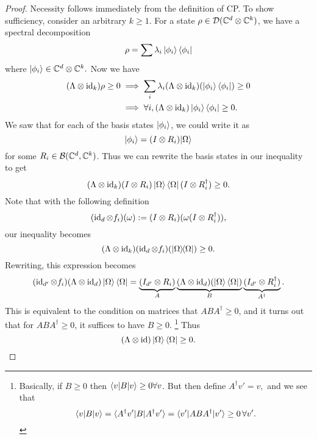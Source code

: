 \begin{proof}
    Necessity follows immediately from the definition of CP. To show sufficiency, consider an arbitrary $k\geq 1$. For a state $\rho \in \mathcal{D}(\mathbb{C}^d \otimes \mathbb{C}^k)$, we have a spectral decomposition
    \begin{equation}
        \rho =\sum \lambda_i \left| \phi_i \right>\left< \phi_i \right|
    \end{equation}
    where $\lvert\phi_i\rangle\in \mathbb{C}^d \otimes \mathbb{C}^k.$
    Now we have
    \begin{align}
        (\Lambda \otimes \text{id}_k)\rho \geq 0 &\implies \sum_i \lambda_i(\Lambda \otimes \operatorname{id}_k)(\left| \phi_i \right>\left< \phi_i \right|)\geq 0\\
        &\implies \forall i, (\Lambda \otimes \operatorname{id}_k)\left| \phi_i \right>\left< \phi_i \right| \geq 0.
    \end{align}
    We saw that for each of the basis states $\lvert\phi_i\rangle$, we could write it as
    \begin{equation}
        \lvert\phi_i\rangle=(I\otimes R_i)\lvert\Omega\rangle
    \end{equation}
    for some $R_i\in \mathcal{B}(\mathbb{C}^d, \mathbb{C}^k)$. Thus we can rewrite the basis states in our inequality to get
    \begin{equation}
        (\Lambda \otimes \operatorname{id}_k)(I\otimes R_i)\left| \Omega \right>\left< \Omega \right| (I\otimes R_i^\dagger)\geq 0.
    \end{equation}
    Note that with the following definition
    \begin{equation}
        (\operatorname{id}_d \otimes f_i)(\omega) := (I\otimes R_i)(\omega(I\otimes R_i^\dagger)),
    \end{equation}
    our inequality becomes
    \begin{equation}
        (\Lambda \otimes \operatorname{id}_k)(\operatorname{id}_d \otimes f_i)(\left\lvert{\Omega}\middle\rangle\!\middle\langle{\Omega}\right\rvert) \geq 0.
    \end{equation}
    Rewriting, this expression becomes
    \begin{equation}
        (\operatorname{id}_{d'}\otimes f_i)(\Lambda \otimes \operatorname{id}_d)\left| \Omega \right>\left< \Omega \right| = \underbrace{(I_{d'}\otimes R_i)}_A\underbrace{(\Lambda \otimes \operatorname{id}_d)(\left| \Omega \right>\left< \Omega \right|)}_{B}\underbrace{(I_{d'}\otimes R_i^\dagger)}_{A^\dagger}.
    \end{equation}
    This is equivalent to the condition on matrices that $ABA^\dagger \geq 0$, and it turns out that for $ABA^\dagger \geq 0$, it suffices to have $B\geq 0$.%
        \footnote{Basically, if $B\geq 0$ then $\langle v\rvert B \lvert v\rangle\geq 0\forall v$. But then define $A^\dagger v' = v,$ and we see that 
        \begin{equation*}
            \langle v\rvert B\lvert v\rangle=\langle A^\dagger v'\rvert B\lvert A^\dagger v'\rangle=\langle v'\rvert A BA^\dagger \lvert v'\rangle\geq 0 \,\forall v'.
        \end{equation*}
        }
    Thus
    \begin{equation}
        (\Lambda \otimes \operatorname{id})\left| \Omega \right>\left< \Omega \right| \geq 0. \qedhere
    \end{equation}
\end{proof}

